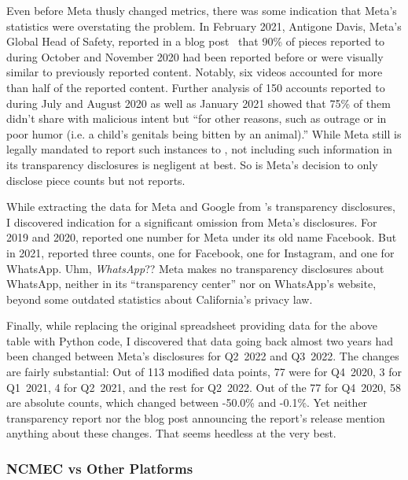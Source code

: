 Even before Meta thusly changed metrics, there was some indication that Meta's
statistics were overstating the problem. In February 2021, Antigone Davis,
Meta's Global Head of Safety, reported in a blog post~\cite{Davis2021} that 90\%
of pieces reported to  during October and November 2020 had been reported
before or were visually similar to previously reported content. Notably, six
videos accounted for more than half of the reported content. Further analysis of
150 accounts reported to  during July and August 2020 as well as January
2021 showed that 75\% of them didn't share  with malicious intent but
``for other reasons, such as outrage or in poor humor (i.e. a child's genitals
being bitten by an animal).'' While Meta still is legally mandated to report
such instances to , not including such information in its transparency
disclosures is negligent at best. So is Meta's decision to only disclose piece
counts but not reports.

While extracting the data for Meta and Google from 's transparency
disclosures, I discovered indication for a significant omission from Meta's
disclosures. For 2019 and 2020,  reported one number for Meta under its
old name Facebook. But in 2021,  reported three counts, one for Facebook,
one for Instagram, and one for WhatsApp. Uhm, \emph{WhatsApp}?? Meta makes no
transparency disclosures about WhatsApp, neither in its ``transparency center''
nor on WhatsApp's website, beyond some outdated statistics about California's
privacy law.

Finally, while replacing the original spreadsheet providing data for the above
table with Python code, I discovered that data going back almost two years had
been changed between Meta's disclosures for Q2~2022 and Q3~2022. The changes are
fairly substantial: Out of 113 modified data points, 77 were for Q4~2020, 3 for
Q1~2021, 4 for Q2~2021, and the rest for Q2~2022. Out of the 77 for Q4~2020, 58
are absolute counts, which changed between -50.0\% and -0.1\%. Yet neither
transparency report nor the blog post announcing the report's release mention
anything about these changes. That seems heedless at the very best.


\subsubsection{NCMEC vs Other Platforms}

